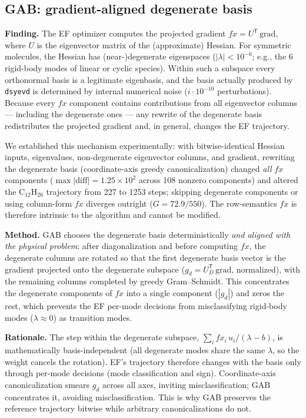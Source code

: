 \documentclass[preprint,12pt]{elsarticle}
\begin{document}
\subsection{GAB: gradient-aligned degenerate basis}\label{sec:method-gab}

\textbf{Finding.} The EF optimizer \cite{baker1986,schlegel1982} computes the projected gradient $fx = U^{\mathsf T}\,\mathrm{grad}$, where $U$ is the eigenvector matrix of the (approximate) Hessian. For symmetric molecules, the Hessian has (near-)degenerate eigenspaces ($|\lambda| < 10^{-6}$; e.g., the 6 rigid-body modes of linear or cyclic species). Within such a subspace every orthonormal basis is a legitimate eigenbasis, and the basis actually produced by \texttt{dsyevd} is determined by internal numerical noise ($i\cdot10^{-10}$ perturbations). Because every $fx$ component contains contributions from all eigenvector columns --- including the degenerate ones --- any rewrite of the degenerate basis redistributes the projected gradient and, in general, changes the EF trajectory.

We established this mechanism experimentally: with bitwise-identical Hessian inputs, eigenvalues, non-degenerate eigenvector columns, and gradient, rewriting the degenerate basis (coordinate-axis greedy canonicalization) changed \emph{all} $fx$ components ($\max|\mathrm{diff}| = 1.25\times10^{2}$ across 108 nonzero components) and altered the C$_{12}$H$_{26}$ trajectory from 227 to 1253 steps; skipping degenerate components or using column-form $fx$ diverges outright ($G = 72.9 / 550$). The row-semantics $fx$ is therefore intrinsic to the algorithm and cannot be modified.

\textbf{Method.} GAB chooses the degenerate basis deterministically \emph{and aligned with the physical problem}: after diagonalization and before computing $fx$, the degenerate columns are rotated so that the first degenerate basis vector is the gradient projected onto the degenerate subspace ($g_d = U_D^{\mathsf T}\,\mathrm{grad}$, normalized), with the remaining columns completed by greedy Gram--Schmidt. This concentrates the degenerate components of $fx$ into a single component ($|g_d|$) and zeros the rest, which prevents the EF per-mode decisions from misclassifying rigid-body modes ($\lambda \approx 0$) as transition modes.

\textbf{Rationale.} The step within the degenerate subspace, $\sum_i fx_i\,u_i/(\lambda-b)$, is mathematically basis-independent (all degenerate modes share the same $\lambda$, so the weight cancels the rotation). EF's trajectory therefore changes with the basis only through per-mode decisions (mode classification and sign). Coordinate-axis canonicalization smears $g_d$ across all axes, inviting misclassification; GAB concentrates it, avoiding misclassification. This is why GAB preserves the reference trajectory bitwise while arbitrary canonicalizations do not.
\end{document}
